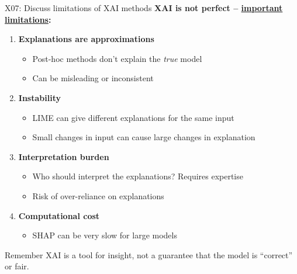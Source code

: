 \documentclass[aspectratio=169, 10pt]{beamer}
\begin{document}
\begin{frame}{X07: Discuss limitations of XAI methods}
    \textbf{XAI is not perfect -- \href{https://arxiv.org/abs/2006.11371}{important limitations}:}
    
    \vspace{0.2cm}
    \begin{enumerate}
        \item \textbf{Explanations are approximations}
        \begin{itemize}
            \item Post-hoc methods don't explain the \textit{true} model
            \item Can be misleading or inconsistent
        \end{itemize}
        
        \item \textbf{Instability}
        \begin{itemize}
            \item LIME can give different explanations for the same input
            \item Small changes in input can cause large changes in explanation
        \end{itemize}
        
        \item \textbf{Interpretation burden}
        \begin{itemize}
            \item Who should interpret the explanations? Requires expertise
            \item Risk of over-reliance on explanations
        \end{itemize}
        
        \item \textbf{Computational cost}
        \begin{itemize}
            \item SHAP can be very slow for large models
        \end{itemize}
    \end{enumerate}
    
    \vspace{0.1cm}
    {\small
    \begin{block}{Remember}
        XAI is a tool for insight, not a guarantee that the model is ``correct'' or fair.
    \end{block}
    }
\end{frame}
\end{document}
